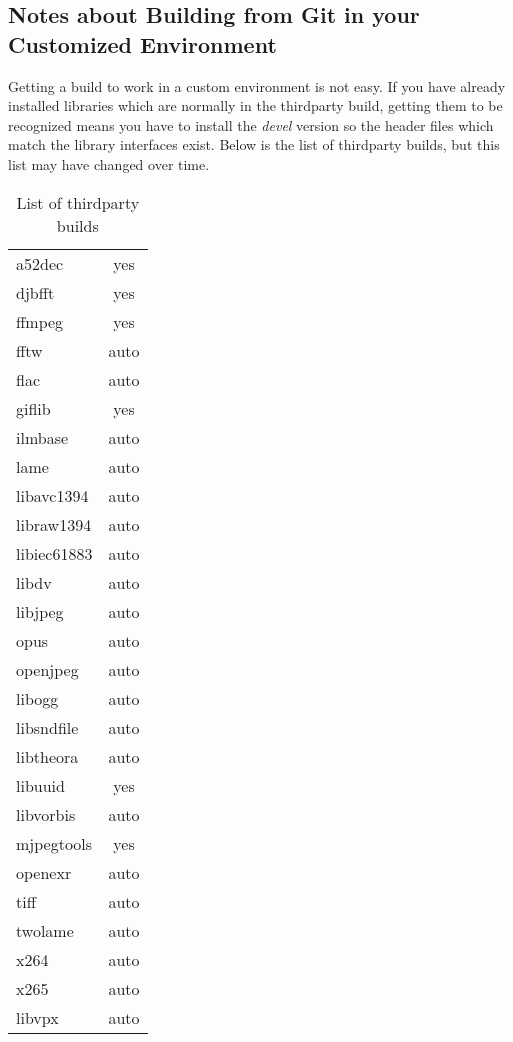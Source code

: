 \subsection{Notes about Building from Git in your Customized Environment}%
\label{sub:notes_about_building_from_git_in_your_customized_environment}

Getting a build to work in a custom environment is not easy.  If you
have already installed libraries which are normally in the
thirdparty build, getting them to be recognized means you have to
install the \textit{devel} version so the header files which match
the library interfaces exist.  Below is the list of thirdparty
builds, but this list may have changed over time.

\begin{table}[htpb]
  \centering
  \caption{List of thirdparty builds}
  \label{tab:List_of_thirdparty_builds}
  \small
  \begin{tabular}{m{8em}c}
    \toprule
 	a52dec   & yes\\
 	djbfft   & yes\\
 	ffmpeg   & yes\\
 	fftw     & auto\\
 	flac     & auto\\
 	giflib   & yes\\
 	ilmbase	 & auto\\
 	lame     & auto\\
 	libavc1394&auto\\
 	libraw1394&auto\\
 	libiec61883&auto\\
    libdv     &auto\\
 	libjpeg   &auto\\
 	opus	  &auto\\
 	openjpeg  &auto\\
 	libogg    &auto\\
 	libsndfile&auto\\
 	libtheora&auto\\
 	libuuid  & yes\\
 	libvorbis&auto\\
 	mjpegtools&yes\\
 	openexr   &auto\\
    tiff      &auto\\
 	twolame   &auto\\
 	x264      &auto\\
 	x265      &auto\\
 	libvpx    &auto\\

\end{tabular}
\end{table}
